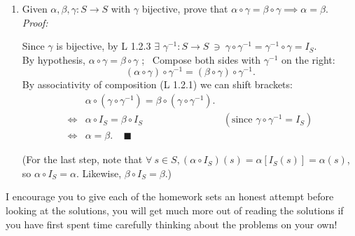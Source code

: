 \begin{enumerate}
    \item Given $\alpha, \beta, \gamma: S \to S$ with $\gamma$ bijective, prove that $\alpha \circ \gamma = \beta \circ \gamma \implies \alpha = \beta$.  \\
          \textit{Proof:}  
          
              Since $\gamma$ is bijective, by L 1.2.3 $\exists$ $\gamma^{-1}: S \to S \ \ni \ \gamma \circ \gamma^{-1} = \gamma^{-1} \circ \gamma = I_S$. \\
              By hypothesis, $\alpha \circ \gamma = \beta \circ \gamma$ ; \ 
              Compose both sides with $\gamma^{-1}$ on the right:
                    \[
                    (\alpha \circ \gamma) \circ \gamma^{-1} = (\beta \circ \gamma) \circ \gamma^{-1}.
                    \]
              By associativity of composition (L 1.2.1) we can shift brackets:
              \begin{align*}
                &\alpha \circ (\gamma \circ \gamma^{-1}) = \beta \circ (\gamma \circ \gamma^{-1}). &\\
                \iff &\alpha \circ I_S = \beta \circ I_S & (\text{since }\gamma \circ \gamma^{-1} = I_S) \\
                \iff &\alpha = \beta. \ \ \ \ \ \blacksquare &
              \end{align*}
                    
              (For the last step, note that $\forall \ s\in S, (\alpha \circ I_S)(s) = \alpha[I_S(s)]=\alpha(s)$, so $\alpha \circ I_S = \alpha$. Likewise, $\beta \circ I_S =\beta$.)
          
\end{enumerate}


\newpage

\begin{tcolorbox}
    I encourage you to give each of the homework sets an honest attempt before looking at the solutions, you will get much more out of reading the solutions if you have first spent time carefully thinking about the problems on your own!
\end{tcolorbox}
\vspace{-0.2in}
